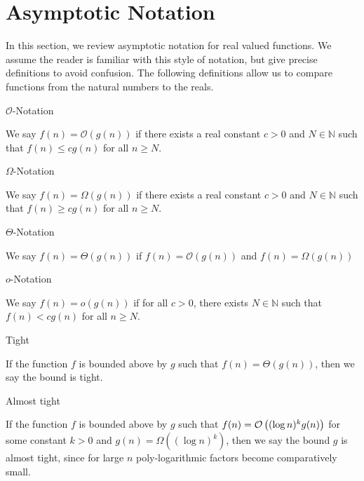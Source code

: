 \section{Asymptotic Notation}

In this section, we review asymptotic notation for real valued functions. We assume the reader is familiar with this style of notation, but give precise definitions to avoid confusion. The following definitions allow us to compare functions from the natural numbers to the reals.

\begin{definition}
	$\mathcal{O}$-Notation

	\noindent
	We say $f(n) = \mathcal{O}(g(n))$ if there exists a real constant $c > 0$ and $N \in \mathbb{N}$ such that $f(n) \leq c g(n)$ for all $n \geq N$. 
\end{definition}

\begin{definition}
	$\Omega$-Notation

	\noindent
	We say $f(n) = \Omega(g(n))$ if there exists a real constant $c > 0$ and $N \in \mathbb{N}$ such that $f(n) \geq c g(n)$ for all $n \geq N$. 
\end{definition}

\begin{definition}
	$\Theta$-Notation

	\noindent
	We say $f(n) = \Theta(g(n))$ if $f(n) = \mathcal{O}(g(n))$ and $f(n) = \Omega(g(n))$
\end{definition}

\begin{definition}
	$o$-Notation

	\noindent
	We say $f(n) = o(g(n))$ if for all $c > 0$, there exists $N \in \mathbb{N}$ such that $f(n) < c g(n)$ for all $n \geq N$.
\end{definition}

\begin{definition}
	Tight

	\noindent
	If the function $f$ is bounded above by $g$ such that $f(n) = \Theta(g(n))$, then we say the bound is tight. 
\end{definition}

\begin{definition}
	Almost tight

	\noindent
	If the function $f$ is bounded above by $g$ such that $f(n) = \mathcal{O}\left((\log n)^k g(n)\right)$ for some constant $k>0$ and $g(n) = \Omega((\log n)^k)$, then we say the bound $g$ is almost tight, since for large $n$ poly-logarithmic factors become comparatively small. 
\end{definition}

